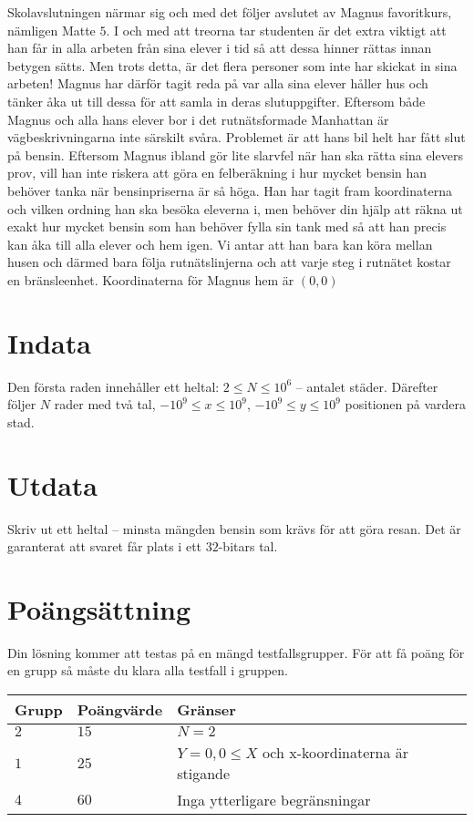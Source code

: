 Skolavslutningen närmar sig och med det följer avslutet av Magnus favoritkurs, nämligen Matte $5$. 
I och med att treorna tar studenten är det extra viktigt att han får in alla arbeten från sina elever i tid så att dessa hinner rättas innan betygen sätts.
Men trots detta, är det flera personer som inte har skickat in sina arbeten! Magnus har därför tagit reda på var alla sina elever håller hus och tänker åka ut till dessa för att samla in deras slutuppgifter.
Eftersom både Magnus och alla hans elever bor i det rutnätsformade Manhattan är vägbeskrivningarna inte särskilt svåra. Problemet är att hans bil helt har fått slut på bensin.
Eftersom Magnus ibland gör lite slarvfel när han ska rätta sina elevers prov, vill han inte riskera att göra en felberäkning i hur mycket bensin han behöver tanka när bensinpriserna är så höga.
Han har tagit fram koordinaterna och vilken ordning han ska besöka eleverna i, men behöver din hjälp att räkna ut exakt hur mycket bensin som han behöver fylla sin tank med så att han precis kan åka till alla elever och hem igen.
Vi antar att han bara kan köra mellan husen och därmed bara följa rutnätslinjerna och att varje steg i rutnätet kostar en bränsleenhet.
Koordinaterna för Magnus hem är $(0, 0)$

\section*{Indata}
Den första raden innehåller ett heltal: $2\leq N \leq 10^6$ -- antalet städer. 
Därefter följer $N$ rader med två tal, $-10^9 \leq x \leq 10^9$, $-10^9 \leq y \leq 10^9$ positionen på vardera stad.


\section*{Utdata}
Skriv ut ett heltal -- minsta mängden bensin som krävs för att göra resan. Det är garanterat att svaret får plats i ett $32$-bitars tal.

\section*{Poängsättning}
Din lösning kommer att testas på en mängd testfallsgrupper.
För att få poäng för en grupp så måste du klara alla testfall i gruppen.

\noindent
\begin{tabular}{| l | l | p{12cm} |}
  \hline
  Grupp & Poängvärde & Gränser \\ \hline
  $2$   & $15$       & $N=2$ \\ \hline
  $1$   & $25$       & $Y=0, 0 \leq X$ och x-koordinaterna är stigande \\ \hline
  $4$   & $60$       & Inga ytterligare begränsningar  \\ \hline
\end{tabular}

